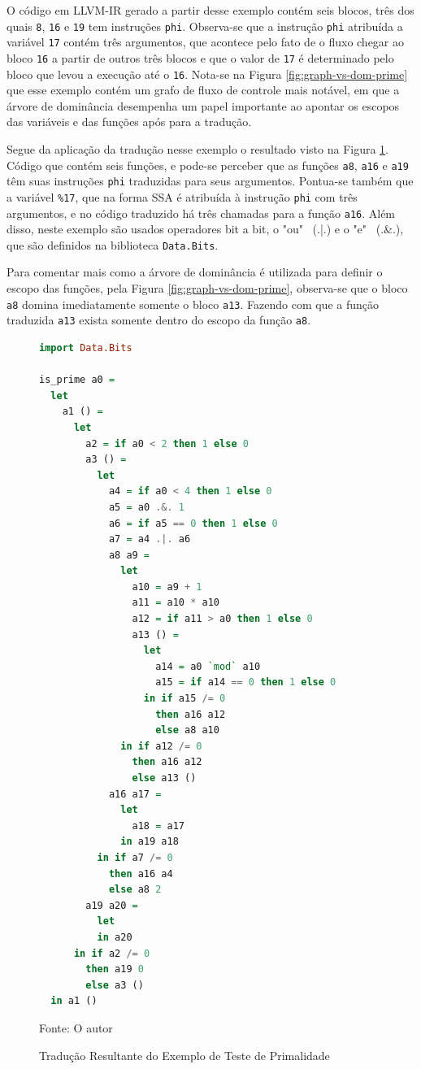 O código em LLVM-IR gerado a partir desse exemplo contém seis blocos, três dos quais \verb|8|, \verb|16| e \verb|19| tem instruções \verb|phi|. Observa-se que a instrução \verb|phi| atribuída a variável \verb|17| contém três argumentos, que acontece pelo fato de o fluxo chegar ao bloco \verb|16| a partir de outros três blocos e que o valor de \verb|17| é determinado pelo bloco que levou a execução até o \verb|16|. Nota-se na Figura \ref{fig:graph-vs-dom-prime} que esse exemplo contém um grafo de fluxo de controle mais notável, em que a árvore de dominância desempenha um papel importante ao apontar os escopos das variáveis e das funções após para a tradução.

Segue da aplicação da tradução nesse exemplo o resultado visto na Figura \ref{fig:primo-saida}. Código que contém seis funções, e pode-se perceber que as funções \verb|a8|, \verb|a16| e \verb|a19| têm suas instruções \verb|phi| traduzidas para seus argumentos. Pontua-se também que a variável \verb|%17|, que na forma SSA é atribuída à instrução \verb|phi| com três argumentos, e no código traduzido há três chamadas para a função \verb|a16|. Além disso, neste exemplo são usados operadores bit a bit, o "ou" \ (.|.) e o "e" \ (.\&.), que são definidos na biblioteca \verb|Data.Bits|.

Para comentar mais como a árvore de dominância é utilizada para definir o escopo das funções, pela Figura \ref{fig:graph-vs-dom-prime}, observa-se que o bloco \verb|a8| domina imediatamente somente o bloco \verb|a13|. Fazendo com que a função traduzida \verb|a13| exista somente dentro do escopo da função \verb|a8|.

\begin{figure}[h]
\centering
\lstset{xleftmargin=.16\textwidth}
\begin{lstlisting}[language=haskell,style=nasm]
import Data.Bits

is_prime a0 =
  let
    a1 () =
      let
        a2 = if a0 < 2 then 1 else 0
        a3 () =
          let
            a4 = if a0 < 4 then 1 else 0
            a5 = a0 .&. 1
            a6 = if a5 == 0 then 1 else 0
            a7 = a4 .|. a6
            a8 a9 =
              let
                a10 = a9 + 1
                a11 = a10 * a10
                a12 = if a11 > a0 then 1 else 0
                a13 () =
                  let
                    a14 = a0 `mod` a10
                    a15 = if a14 == 0 then 1 else 0
                  in if a15 /= 0
                    then a16 a12
                    else a8 a10
              in if a12 /= 0
                then a16 a12
                else a13 ()
            a16 a17 =
              let
                a18 = a17
              in a19 a18
          in if a7 /= 0
            then a16 a4
            else a8 2
        a19 a20 =
          let
          in a20 
      in if a2 /= 0
        then a19 0
        else a3 ()
  in a1 ()
\end{lstlisting}
\caption{Tradução Resultante do Exemplo de Teste de Primalidade}
\label{fig:primo-saida}
\small{Fonte: O autor}
\end{figure}

